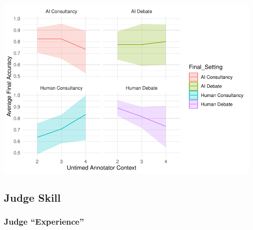 \documentclass[
]{article}
\begin{document}
\includegraphics[width=1\linewidth]{debate-2309_files/figure-latex/Accuracy by Context Graph-3}

\subsection{Judge Skill}\label{judge-skill}

\subsubsection{Judge ``Experience''}\label{judge-experience}
\end{document}
